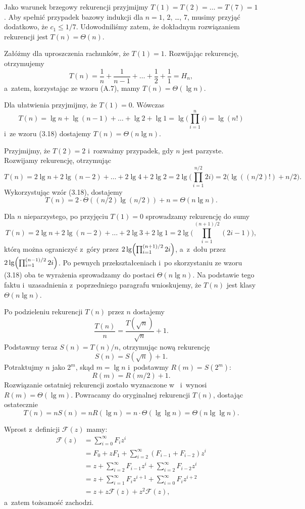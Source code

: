 Jako warunek brzegowy rekurencji przyjmijmy $T(1)=T(2)=\dots=T(7)=1$.
Aby spełnić przypadek bazowy indukcji dla $n=1$, 2, \dots, 7, musimy przyjąć dodatkowo, że $c_1\le1/7$.
Udowodniliśmy zatem, że dokładnym rozwiązaniem rekurencji jest $T(n)=\Theta(n)$.

\subproblem %
Załóżmy dla uproszczenia rachunków, że $T(1)=1$.
Rozwijając rekurencję, otrzymujemy
\[
	T(n) = \frac{1}{n}+\frac{1}{n-1}+\dots+\frac{1}{2}+\frac{1}{1} = H_n,
\]
a~zatem, korzystając ze wzoru (A.7), mamy $T(n)=\Theta(\lg n)$.

\subproblem %
Dla ułatwienia przyjmijmy, że $T(1)=0$.
Wówczas
\[
	T(n) = \lg n+\lg(n-1)+\dots+\lg2+\lg1 = \lg\biggl(\prod_{i=1}^ni\biggr) = \lg(n!)
\]
i~ze wzoru (3.18) dostajemy $T(n)=\Theta(n\lg n)$.

\subproblem %
Przyjmijmy, że $T(2)=2$ i~rozważmy przypadek, gdy $n$ jest parzyste.
Rozwijamy rekurencję, otrzymując
\[
	T(n) = 2\lg n+2\lg(n-2)+\dots+2\lg4+2\lg2 = 2\lg\biggl(\prod_{i=1}^{n/2}2i\biggr) = 2\bigl(\lg((n/2)!)+n/2\bigr).
\]
Wykorzystując wzór (3.18), dostajemy
\[
	T(n) = 2\cdot\Theta((n/2)\lg (n/2))+n = \Theta(n\lg n).
\]

Dla $n$ nieparzystego, po przyjęciu $T(1)=0$ sprowadzamy rekurencję do sumy
\[
	T(n) = 2\lg n+2\lg(n-2)+\dots+2\lg3+2\lg1 = 2\lg\biggl(\prod_{i=1}^{(n+1)/2}(2i-1)\biggr),
\]
którą można ograniczyć z~góry przez $2\lg\Bigl(\prod_{i=1}^{(n+1)/2}2i\Bigr)$, a~z~dołu przez $2\lg\Bigl(\prod_{i=1}^{(n-1)/2}2i\Bigr)$.
Po pewnych przekształceniach i~po skorzystaniu ze wzoru (3.18) oba te wyrażenia sprowadzamy do postaci $\Theta(n\lg n)$.
Na podstawie tego faktu i~uzasadnienia z~poprzedniego paragrafu wnioskujemy, że $T(n)$ jest klasy $\Theta(n\lg n)$.

\subproblem %
Po podzieleniu rekurencji $T(n)$ przez $n$ dostajemy
\[
	\frac{T(n)}{n} = \frac{T(\!\sqrt{n})}{\sqrt{n}}+1.
\]
Podstawmy teraz $S(n)=T(n)/n$, otrzymując nową rekurencję
\[
	S(n) = S(\!\sqrt{n})+1.
\]
Potraktujmy $n$ jako $2^m$, skąd $m=\lg n$ i~podstawmy $R(m)=S(2^m)$:
\[
	R(m) = R(m/2)+1.
\]
Rozwiązanie ostatniej rekurencji zostało wyznaczone w~ i~wynosi $R(m)=\Theta(\lg m)$.
Powracamy do oryginalnej rekurencji $T(n)$, dostając ostatecznie
\[
	T(n) = nS(n) = nR(\lg n) = n\cdot\Theta(\lg\lg n) = \Theta(n\lg\lg n).
\]


\subproblem %
Wprost z~definicji $\mathcal{F}(z)$ mamy:
\begin{align*}
	\mathcal{F}(z) &= \sum_{i=0}^\infty F_iz^i \\
	&= F_0+zF_1+\sum_{i=2}^\infty (F_{i-1}+F_{i-2})z^i \\
	&= z+\sum_{i=2}^\infty F_{i-1}z^i+\sum_{i=2}^\infty F_{i-2}z^i \\
	&= z+\sum_{i=1}^\infty F_iz^{i+1}+\sum_{i=0}^\infty F_iz^{i+2} \\[2mm]
	&= z+z\mathcal{F}(z)+z^2\mathcal{F}(z),
\end{align*}
a~zatem tożsamość zachodzi.


